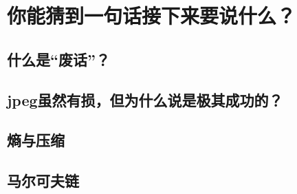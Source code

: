 \section{你能猜到一句话接下来要说什么？}
\subsection{什么是“废话”？}
\subsection{jpeg虽然有损，但为什么说是极其成功的？}
\subsection{熵与压缩}
\subsection{马尔可夫链}